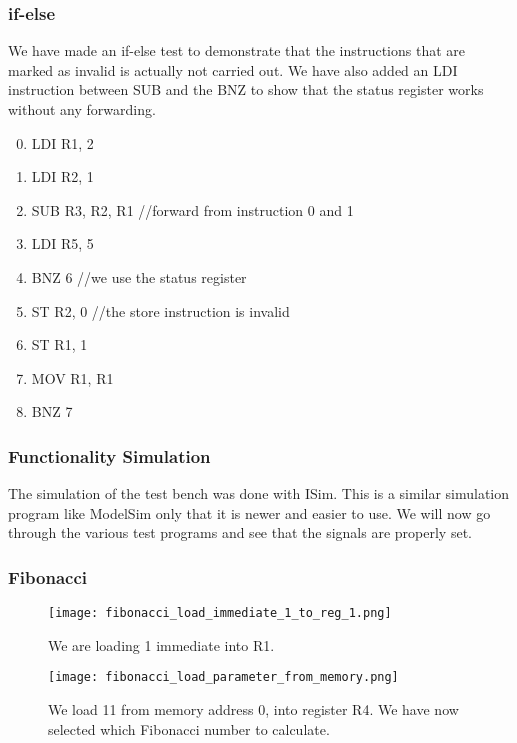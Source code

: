 \documentclass[11pt]{article}
\begin{document}
\subsubsection*{if-else}
We have made an if-else test to demonstrate that the instructions that
are marked as invalid is actually not carried out. We have also added
an LDI instruction between SUB and the BNZ to show that the status
register works without any forwarding.
\begin{enumerate}
\setcounter{enumi}{-1}
\item LDI R1, 2 
\item LDI R2, 1
\item SUB R3, R2, R1 //forward from instruction 0 and 1
\item LDI R5, 5
\item BNZ 6 //we use the status register
\item ST R2, 0 //the store instruction is invalid
\item ST R1, 1
\item MOV R1, R1
\item BNZ 7
\end{enumerate}

\subsubsection{Functionality Simulation}
\label{subsubsec:funcsim}
The simulation of the test bench was done with ISim. This is a similar
simulation program like ModelSim only that it is newer and easier to
use. We will now go through the various test programs and see that the
signals are properly set.

\subsubsection*{Fibonacci}
\begin{figure}[!h]
\texttt{[image: fibonacci\_load\_immediate\_1\_to\_reg\_1.png]}
\caption{We are loading 1 immediate into R1.}
\label{fig:register_write}
\end{figure}

\begin{figure}[!h]
\texttt{[image: fibonacci\_load\_parameter\_from\_memory.png]}
\caption{We load 11 from memory address 0, into register R4. We have now selected which Fibonacci number to calculate.}
\label{fig:register_write}
\end{figure}

\pagebreak
\end{document}
